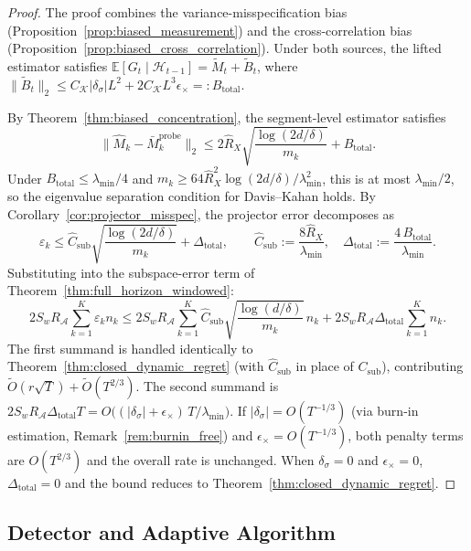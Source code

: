 \documentclass{article}
\newcommand{\E}{\mathbb{E}}
\newcommand{\cA}{\mathcal{A}}
\newcommand{\cH}{\mathcal{H}}
\begin{document}
\begin{proof}
The proof combines the variance-misspecification bias (Proposition~\ref{prop:biased_measurement}) and the cross-correlation bias (Proposition~\ref{prop:biased_cross_correlation}).
Under both sources, the lifted estimator satisfies $\E[G_t \mid \cH_{t-1}] = \widetilde M_t + \widetilde B_t$, where $\|\widetilde B_t\|_2 \le C_{\mathcal K}|\delta_\sigma|L^2 + 2C_{\mathcal K}L^3\epsilon_\times =: B_{\mathrm{total}}$.

By Theorem~\ref{thm:biased_concentration}, the segment-level estimator satisfies
\[
\|\widehat M_k - \bar M_k^{\mathrm{probe}}\|_2 \le 2\hat R_X\sqrt{\frac{\log(2d/\delta)}{m_k}} + B_{\mathrm{total}}.
\]
Under $B_{\mathrm{total}} \le \lambda_{\min}/4$ and $m_k \ge 64\hat R_X^2\log(2d/\delta)/\lambda_{\min}^2$, this is at most $\lambda_{\min}/2$, so the eigenvalue separation condition for Davis--Kahan holds.
By Corollary~\ref{cor:projector_misspec}, the projector error decomposes as
\[
\varepsilon_k \le \hat C_{\mathrm{sub}}\sqrt{\frac{\log(2d/\delta)}{m_k}} + \Delta_{\mathrm{total}}, \qquad \hat C_{\mathrm{sub}} := \frac{8\hat R_X}{\lambda_{\min}}, \quad \Delta_{\mathrm{total}} := \frac{4\,B_{\mathrm{total}}}{\lambda_{\min}}.
\]
Substituting into the subspace-error term of Theorem~\ref{thm:full_horizon_windowed}:
\[
2S_wR_{\cA}\sum_{k=1}^K\varepsilon_k n_k \le 2S_wR_{\cA}\sum_{k=1}^K \hat C_{\mathrm{sub}}\sqrt{\frac{\log(d/\delta)}{m_k}}\,n_k + 2S_wR_{\cA}\Delta_{\mathrm{total}} \sum_{k=1}^K n_k.
\]
The first summand is handled identically to Theorem~\ref{thm:closed_dynamic_regret} (with $\hat C_{\mathrm{sub}}$ in place of $C_{\mathrm{sub}}$), contributing $\widetilde O(r\sqrt{T}) + \widetilde O(T^{2/3})$.
The second summand is $2S_wR_{\cA}\Delta_{\mathrm{total}} T = O\bigl((|\delta_\sigma| + \epsilon_\times)\,T/\lambda_{\min}\bigr)$.
If $|\delta_\sigma| = O(T^{-1/3})$ (via burn-in estimation, Remark~\ref{rem:burnin_free}) and $\epsilon_\times = O(T^{-1/3})$, both penalty terms are $O(T^{2/3})$ and the overall rate is unchanged.
When $\delta_\sigma = 0$ and $\epsilon_\times = 0$, $\Delta_{\mathrm{total}} = 0$ and the bound reduces to Theorem~\ref{thm:closed_dynamic_regret}.
\end{proof}

\subsection{Detector and Adaptive Algorithm}
\end{document}

